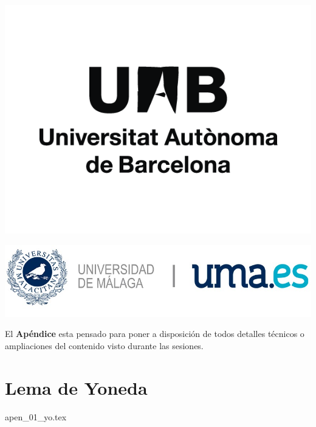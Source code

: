 \documentclass[12pt, a4paper]{article}
\begin{document}
\begin{titlepage}
\includegraphics[scale=0.25]{Logo_UAB.png}

\vspace*{\fill}

\vspace*{\fill}

\includegraphics[scale=0.25]{Logo_UMA.jpg}

\vspace*{\fill}
\end{titlepage}

El {\bf Apéndice} esta pensado para poner a disposición de todos detalles técnicos o ampliaciones del contenido visto durante las sesiones.
\newpage
\section{Lema de Yoneda}

{apen_01_yo.tex}
\end{document}

